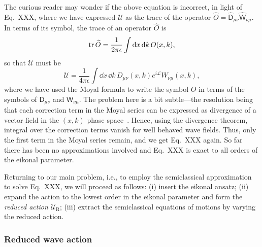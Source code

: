 The curious reader may wonder if the above equation is incorrect, in light of Eq.~XXX, where we have expressed $\mathscr{U}$ as the trace of the operator $\widehat{O} = \widehat{\mathsf{D}}_{\mu\nu}\widehat{\mathsf{W}}_{\nu\mu}$.
In terms of its symbol, the trace of an operator $\widehat{O}$ is
%
\begin{equation}
  \operatorname{tr}\widehat{O} = \frac{1}{2\pi\epsilon} \int \mathrm{d}{x}\,\mathrm{d}{k}\, O(x, k),
\end{equation}
%
so that $\mathscr{U}$ must be
%
\begin{equation}
  \mathscr{U} = \frac{1}{4\pi\epsilon}\int \dd{x}\,\dd{k}\, D_{\mu\nu}(x,k)e^{i\mathcal{L}}W_{\nu\mu}(x, k),
\end{equation}
%
where we have used the Moyal formula to write the symbol $O$ in terms of the symbols of $\mathsf{D}_{\mu\nu}$ and $\mathsf{W}_{\nu\mu}$.
The problem here is a bit subtle---the resolution being that each correction term in the Moyal series can be expressed as divergence of a vector field in the $(x, k)$ phase space~\cite[Problem 3.16]{tracy2014}.
Hence, using the divergence theorem, integral over the correction terms vanish for well behaved wave fields.
Thus, only the first term in the Moyal series remain, and we get Eq.~XXX again.
So far there has been no approximations involved and Eq.~XXX is exact to all orders of the eikonal parameter.

Returning to our main problem, i.e., to employ the semiclassical approximation to solve Eq.~XXX, we will proceed as follows: (i) insert the eikonal ansatz; (ii) expand the action to the lowest order in the eikonal parameter and form the \emph{reduced action} $\mathscr{U}_{\text{R}}$; (iii) extract the semiclassical equations of motions by varying the reduced action.

\subsubsection*{Reduced wave action}

